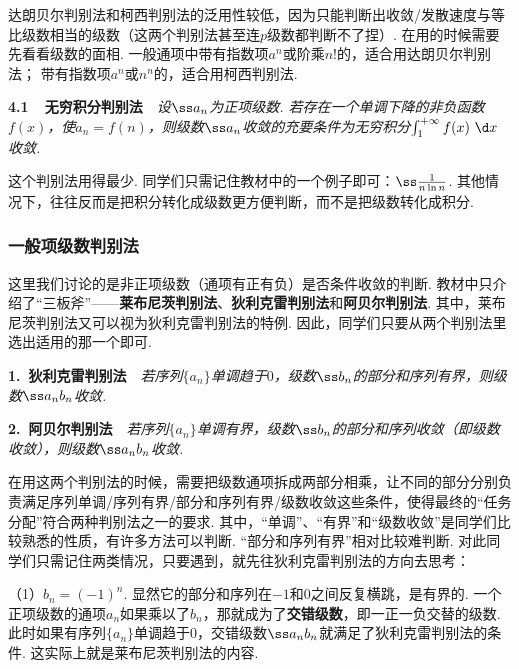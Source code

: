 达朗贝尔判别法和柯西判别法的泛用性较低，因为只能判断出收敛/发散速度与等比级数相当的级数（这两个判别法甚至连$p$级数都判断不了捏）.
在用的时候需要先看看级数的面相.
一般通项中带有指数项$a^n$或阶乘$n!$的，适合用达朗贝尔判别法；
带有指数项$a^n$或$n^n$的，适合用柯西判别法.\vspace{1em}

\textbf{4.1~~无穷积分判别法}~~\textit{设$\ss a_n$为正项级数. 若存在一个单调下降的非负函数$f(x)$，使$a_n = f(n)$，则级数$\ss a_n$收敛的充要条件为无穷积分$\int_{1}^{+\infty} f(x) ~\d x$收敛.}\vspace{0.5em}

这个判别法用得最少.
同学们只需记住教材中的一个例子即可：$\ss \frac{1}{n \ln n}$.
其他情况下，往往反而是把积分转化成级数更方便判断，而不是把级数转化成积分.

\subsubsection{一般项级数判别法}

这里我们讨论的是非正项级数（通项有正有负）是否条件收敛的判断.
教材中只介绍了“三板斧”——\textbf{莱布尼茨判别法}、\textbf{狄利克雷判别法}和\textbf{阿贝尔判别法}.
其中，莱布尼茨判别法又可以视为狄利克雷判别法的特例.
因此，同学们只要从两个判别法里选出适用的那一个即可.\vspace{1em}

\textbf{1.~狄利克雷判别法}~~\textit{若序列$\{a_n \}$单调趋于$0$，级数$\ss b_n$的部分和序列有界，则级数$\ss a_n b_n$收敛.}\vspace{0.5em}

\textbf{2.~阿贝尔判别法}~~\textit{若序列$\{a_n \}$单调有界，级数$\ss b_n$的部分和序列收敛（即级数收敛），则级数$\ss a_n b_n$收敛.}\vspace{0.5em}

在用这两个判别法的时候，需要把级数通项拆成两部分相乘，让不同的部分分别负责满足序列单调/序列有界/部分和序列有界/级数收敛这些条件，使得最终的“任务分配”符合两种判别法之一的要求.
其中，“单调”、“有界”和“级数收敛”是同学们比较熟悉的性质，有许多方法可以判断.
“部分和序列有界”相对比较难判断.
对此同学们只需记住两类情况，只要遇到，就先往狄利克雷判别法的方向去思考：

（1）$b_n = (-1)^n$. 显然它的部分和序列在$-1$和$0$之间反复横跳，是有界的.
一个正项级数的通项$a_n$如果乘以了$b_n$，那就成为了\textbf{交错级数}，即一正一负交替的级数.
此时如果有序列$\{ a_n \}$单调趋于$0$，交错级数$\ss a_n b_n$就满足了狄利克雷判别法的条件.
这实际上就是莱布尼茨判别法的内容.

